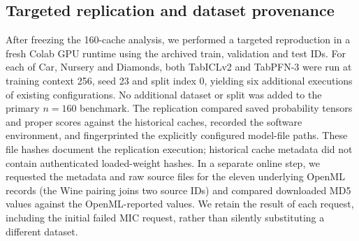 \documentclass[a4paper,fleqn]{cas-sc}
\begin{document}
\begin{table}[t]
\centering
\caption{Two real-model experimental protocols retained as separate evidence streams. The second protocol isolates changes in training context at fixed validation/test IDs; its four randomized split settings are not independent datasets.}
\label{tab:protocols}
\end{table}

\subsection{Targeted replication and dataset provenance}
After freezing the 160-cache analysis, we performed a targeted reproduction in a fresh Colab GPU runtime using the archived train, validation and test IDs. For each of Car, Nursery and Diamonds, both TabICLv2 and TabPFN-3 were run at training context 256, seed 23 and split index 0, yielding six additional executions of existing configurations. No additional dataset or split was added to the primary $n=160$ benchmark. The replication compared saved probability tensors and proper scores against the historical caches, recorded the software environment, and fingerprinted the explicitly configured model-file paths. These file hashes document the replication execution; historical cache metadata did not contain authenticated loaded-weight hashes. In a separate online step, we requested the metadata and raw source files for the eleven underlying OpenML records (the Wine pairing joins two source IDs) and compared downloaded MD5 values against the OpenML-reported values. We retain the result of each request, including the initial failed MIC request, rather than silently substituting a different dataset.
\end{document}
